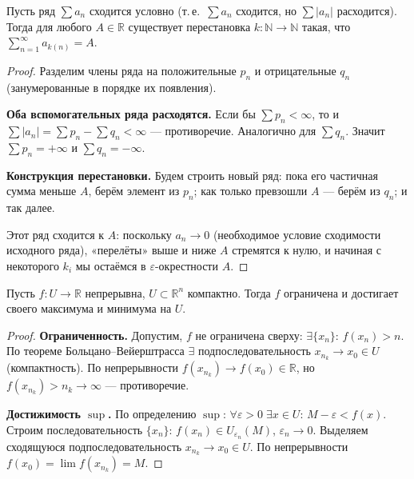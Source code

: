 


\begin{theorem}[Риман]
  Пусть ряд $\sum a_n$ сходится условно (т.\,е.\ $\sum a_n$ сходится, но $\sum |a_n|$ расходится).
  Тогда для любого $A \in \mathbb{R}$ существует перестановка $k: \mathbb{N} \to \mathbb{N}$ такая,
  что $\sum_{n=1}^{\infty} a_{k(n)} = A$.
  \begin{proof}
    Разделим члены ряда на положительные $p_n$ и отрицательные $q_n$
    (занумерованные в порядке их появления).

    \textbf{Оба вспомогательных ряда расходятся.}
    Если бы $\sum p_n < \infty$, то и $\sum|a_n| = \sum p_n - \sum q_n < \infty$ --- противоречие.
    Аналогично для $\sum q_n$. Значит $\sum p_n = +\infty$ и $\sum q_n = -\infty$.

    \textbf{Конструкция перестановки.}
    Будем строить новый ряд: пока его частичная сумма меньше $A$, берём элемент из $p_n$;
    как только превзошли $A$ --- берём из $q_n$; и так далее.

    Этот ряд сходится к $A$: поскольку $a_n \to 0$ (необходимое условие сходимости исходного ряда),
    «перелёты» выше и ниже $A$ стремятся к нулю, и начиная с некоторого $k_i$ мы остаёмся
    в $\varepsilon$-окрестности $A$. \qedhere
  \end{proof}
\end{theorem}


\begin{theorem}
  Пусть $f: U \to \mathbb{R}$ непрерывна, $U \subset \mathbb{R}^n$ компактно.
  Тогда $f$ ограничена и достигает своего максимума и минимума на $U$.
  \begin{proof}
    \textbf{Ограниченность.} Допустим, $f$ не ограничена сверху: $\exists\{x_n\}$:
    $f(x_n) > n$. По теореме Больцано--Вейерштрасса $\exists$ подпоследовательность
    $x_{n_k} \to x_0 \in U$ (компактность). По непрерывности $f(x_{n_k}) \to f(x_0) \in \mathbb{R}$,
    но $f(x_{n_k}) > n_k \to \infty$ --- противоречие.

    \textbf{Достижимость $\sup$.}
    По определению $\sup$: $\forall\varepsilon>0\;\exists x\in U$: $M - \varepsilon < f(x)$.
    Строим последовательность $\{x_n\}$: $f(x_n) \in U_{\varepsilon_n}(M)$, $\varepsilon_n \to 0$.
    Выделяем сходящуюся подпоследовательность $x_{n_k} \to x_0 \in U$.
    По непрерывности $f(x_0) = \lim f(x_{n_k}) = M$. \qedhere
  \end{proof}
\end{theorem}

